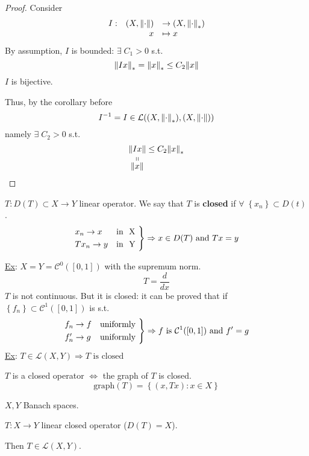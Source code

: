 \begin{proof}
    Consider
    \[
        \begin{array}{lrl}
            I :& (X, \normdot) & \to (X, \normdot_*) \\
            &x & \mapsto x
        \end{array}
    \]
    By assumption, \(I\) is bounded: \(\exists \; C_1 > 0\) s.t. 
    \[
        \norm{Ix}_* = \norm{x}_* \leq C_2 \norm{x}
    \]
    \(I\) is bijective.

    Thus, by the corollary before
    \[
        I^{-1} = I \in \mathcal{L}((X, \normdot_*), (X, \normdot))
    \]
    namely \(\exists \; C_2 > 0\) s.t. 
    \[
        \stackbelow{\norm{Ix}}{\norm{x}} \leq C_2 \norm{x}_*
    \]
\end{proof}
\begin{definition}
    \(T : D(T) \subset X \to Y\) linear operator. We say that \(T\) is \textbf{closed} if \(\forall \; \left\{ x_n \right\} \subset D(t)\). 
    \[
        \begin{rcases*}
            x_n \to x & \mbox{in } X \\
            Tx_n \to y & \mbox{in } Y
        \end{rcases*} \Rightarrow x \in D(T) \mbox{ and } Tx = y
    \]

\end{definition}
\noindent\underline{Ex}: \(X = Y = \mathcal{C}^0([0,1])\) with the supremum norm.
\[
    T = \frac{d}{dx}
\]
\(T\) is not continuous. But it is closed: it can be proved that if \(\left\{ f_n \right\} \subset \mathcal{C}^1([0,1])\) is s.t.
\[
    \begin{rcases*}
        f_n \to f & \mbox{uniformly} \\
        f_n' \to g & \mbox{uniformly}
    \end{rcases*} \Rightarrow f \mbox{ is } \mathcal{C}^1([0,1]) \mbox{ and } f' = g
\] 
\noindent\underline{Ex}: \(T \in \mathcal{L}(X,Y) \Rightarrow T \mbox{ is closed}\)
\begin{remark}
    \(T\) is a closed operator \(\Leftrightarrow\) the graph of \(T\) is closed.
    \[
        \mbox{graph}(T) = \left\{ (x, Tx): x \in X \right\}
    \]
\end{remark}
\begin{theorem}
    \(X, Y\) Banach spaces. 
    
    \(T : X \to Y\) linear closed operator (\(D(T) = X\)). 
    
    Then \(T \in \mathcal{L}(X,Y)\).
\end{theorem}
